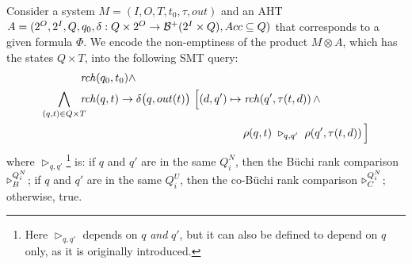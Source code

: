 Consider a system
$M=(I,O,T,t_0,\tau,out)$
and an AHT
$A = (2^O, 2^I, Q, q_0, \delta: Q \times 2^O \to {\cal B}^+(2^I\times Q), Acc \subseteq Q)$
that corresponds to a given \CTLstar formula $\Phi$.
We encode the non-emptiness of the product $M \otimes A$,
which has the states $Q\times T$,
into the following SMT query:
\begin{equation}\label{eq:ctl-haa}
\begin{aligned}
&\mathit{rch}(q_0,t_0) \land \\
\bigwedge_{(q,t) \in Q\times T}\!\!\! &\mathit{rch}(q,t) \rightarrow
\delta\big(q,out(t)\big) ~\Big[(d,q') \mapsto \mathit{rch}\!\left(q',\tau(t,d)\right) \land \\
&~~~~~~~~~~~~~~~~~~~~~~~~~~~~~~~~~~~~~~~~~~~~
\rho(q,t) ~\triangleright_{q,q'}~ \rho\!\left(q',\tau(t,d)\right)\Big]
\end{aligned}
\end{equation}
where $\triangleright_{q,q'}$\footnote{%
  Here $\triangleright_{q,q'}$
  depends on $q$ \emph{and} $q'$,
  but it can also be defined to depend on $q$ only, as it is originally introduced.%
}
is:
\li
\- if $q$ and $q'$ are in the same $Q_i^N$,
   then the B\"uchi rank comparison $\triangleright^{Q_i^N}_B$;
\- if $q$ and $q'$ are in the same $Q_i^U$,
   then the co-B\"uchi rank comparison $\triangleright^{Q_i^N}_C$;
\- otherwise, true.
\il

